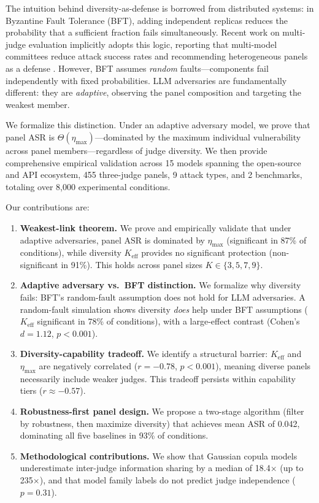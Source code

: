 \documentclass[11pt]{article}
\begin{document}
The intuition behind diversity-as-defense is borrowed from distributed systems: in Byzantine Fault Tolerance (BFT), adding independent replicas reduces the probability that a sufficient fraction fails simultaneously. Recent work on multi-judge evaluation implicitly adopts this logic, reporting that multi-model committees reduce attack success rates and recommending heterogeneous panels as a defense \citep{sok2026,yang2026,turkmen2026}. However, BFT assumes \emph{random} faults---components fail independently with fixed probabilities. LLM adversaries are fundamentally different: they are \emph{adaptive}, observing the panel composition and targeting the weakest member.

We formalize this distinction. Under an adaptive adversary model, we prove that panel ASR is $\Theta(\eta_{\max})$---dominated by the maximum individual vulnerability across panel members---regardless of judge diversity. We then provide comprehensive empirical validation across 15 models spanning the open-source and API ecosystem, 455 three-judge panels, 9 attack types, and 2 benchmarks, totaling over 8,000 experimental conditions.

Our contributions are:

\begin{enumerate}
    \item \textbf{Weakest-link theorem.} We prove and empirically validate that under adaptive adversaries, panel ASR is dominated by $\eta_{\max}$ (significant in 87\% of conditions), while diversity $K_{\text{eff}}$ provides no significant protection (non-significant in 91\%). This holds across panel sizes $K \in \{3,5,7,9\}$.

    \item \textbf{Adaptive adversary vs.\ BFT distinction.} We formalize why diversity fails: BFT's random-fault assumption does not hold for LLM adversaries. A random-fault simulation shows diversity \emph{does} help under BFT assumptions ($K_{\text{eff}}$ significant in 78\% of conditions), with a large-effect contrast (Cohen's $d = 1.12$, $p < 0.001$).

    \item \textbf{Diversity-capability tradeoff.} We identify a structural barrier: $K_{\text{eff}}$ and $\eta_{\max}$ are negatively correlated ($r = -0.78$, $p < 0.001$), meaning diverse panels necessarily include weaker judges. This tradeoff persists within capability tiers ($r \approx -0.57$).

    \item \textbf{Robustness-first panel design.} We propose a two-stage algorithm (filter by robustness, then maximize diversity) that achieves mean ASR of 0.042, dominating all five baselines in 93\% of conditions.

    \item \textbf{Methodological contributions.} We show that Gaussian copula models underestimate inter-judge information sharing by a median of 18.4$\times$ (up to 235$\times$), and that model family labels do not predict judge independence ($p = 0.31$).
\end{enumerate}
\end{document}
